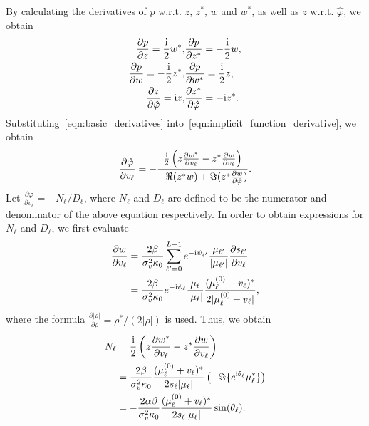 \documentclass[a4paper,12pt]{article}
\def \ri {{\rm i}}
\begin{document}
By calculating the derivatives of $p$ w.r.t. $z$, $z^*$, $w$ and $w^*$, as well as $z$ w.r.t. $\hat{\varphi}$, we obtain 
\begin{equation}
    \begin{aligned}
    \frac{\partial p}{\partial z}=\frac{\ri}{2} w^*, & \frac{\partial p}{\partial z^*}=-\frac{\ri}{2} w, \\
    \frac{\partial p}{\partial w}=-\frac{\ri}{2} z^*, & \frac{\partial p}{\partial w^*}=\frac{\ri}{2} z, \\
    \frac{\partial z}{\partial \hat\varphi}=\ri z, & \frac{\partial z^*}{\partial \hat\varphi}=-\ri z^*. 
    \end{aligned}
    \label{eqn:basic_derivatives}
\end{equation}
Substituting~\eqref{eqn:basic_derivatives} into~\eqref{eqn:implicit_function_derivative}, we obtain 
\begin{equation}
    \frac{\partial \hat\varphi}{\partial v_\ell} = -\frac{\frac{\ri}{2} \left( z\frac{\partial w^*}{\partial v_\ell} -z^* \frac{\partial w}{\partial v_\ell} \right)}{-\Re(z^*w) +\Im(z^* \frac{\partial w}{\partial \hat{\varphi}})}. 
\end{equation}
Let $\frac{\partial \varphi}{\partial v_\ell} = -N_\ell / D_\ell$, where $N_\ell$ and $D_\ell$ are defined to be the numerator and denominator of the above equation respectively. In order to obtain expressions for $N_\ell$ and $D_\ell$, we first evaluate 
\begin{equation}
    \begin{aligned}
        \frac{\partial w}{\partial v_\ell}&=\frac{2\beta}{\sigma_v^2 \kappa_0} \sum_{\ell'=0}^{L-1} e^{-\ri \psi_{\ell'}} \frac{\mu_{\ell'}}{|\mu_{\ell'}|} \frac{\partial s_{\ell'}}{\partial v_\ell} \\
        &= \frac{2\beta}{\sigma_v^2 \kappa_0} e^{-\ri \psi_\ell}\frac{\mu_\ell}{|\mu_\ell|} \frac{(\mu_\ell^{(0)} + v_\ell)^*}{2|\mu_\ell^{(0)} + v_\ell|}, 
    \end{aligned}
\end{equation}
where the formula $\frac{\partial |\rho|}{\partial \rho}  = \rho^*/(2|\rho|)$ is used. 
Thus, we obtain 
\begin{equation}
    \begin{aligned}
        N_\ell &= \frac{\ri}{2} \left( z\frac{\partial w^*}{\partial v_\ell} -z^* \frac{\partial w}{\partial v_\ell} \right) \\
        &= \frac{2\beta}{\sigma_v^2 \kappa_0} \frac{(\mu_\ell^{(0)} + v_\ell)^*}{2s_\ell |\mu_\ell|} \left(-\Im\{e^{\ri \theta_\ell} \mu_\ell^* \}\right) \\
        &= -\frac{2\alpha\beta}{\sigma_v^2 \kappa_0} \frac{(\mu_\ell^{(0)} + v_\ell)^*}{2s_\ell |\mu_\ell|} \sin(\theta_\ell). 
    \end{aligned}
\end{equation}
\end{document}
